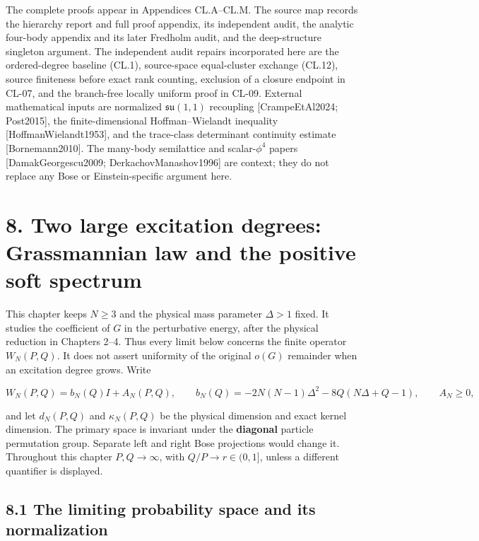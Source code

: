 \documentclass[a4paper,11pt]{article}
\numberwithin{equation}{section}
\begin{document}
The complete proofs appear in Appendices CL.A--CL.M. The source map records the hierarchy report and full proof appendix, its independent audit, the analytic four-body appendix and its later Fredholm audit, and the deep-structure singleton argument. The independent audit repairs incorporated here are the ordered-degree baseline (CL.1), source-space equal-cluster exchange (CL.12), source finiteness before exact rank counting, exclusion of a closure endpoint in CL-07, and the branch-free locally uniform proof in CL-09. External mathematical inputs are normalized \(\mathfrak{su}(1,1)\) recoupling {[}CrampeEtAl2024; Post2015{]}, the finite-dimensional Hoffman--Wielandt inequality {[}HoffmanWielandt1953{]}, and the trace-class determinant continuity estimate {[}Bornemann2010{]}. The many-body semilattice and scalar-\(\phi^4\) papers {[}DamakGeorgescu2009; DerkachovManashov1996{]} are context; they do not replace any Bose or Einstein-specific argument here.

\clearpage
\hypertarget{two-large-excitation-degrees-grassmannian-law-and-the-positive-soft-spectrum}{%
\section{8. Two large excitation degrees: Grassmannian law and the positive soft spectrum}\label{two-large-excitation-degrees-grassmannian-law-and-the-positive-soft-spectrum}}

This chapter keeps \(N\geq3\) and the physical mass parameter \(\Delta>1\) fixed. It studies the coefficient of \(G\) in the perturbative energy, after the physical reduction in Chapters 2--4. Thus every limit below concerns the finite operator \(W_N(P,Q)\). It does not assert uniformity of the original \(o(G)\) remainder when an excitation degree grows. Write

\[
W_N(P,Q)=b_N(Q)I+A_N(P,Q),\qquad
b_N(Q)=-2N(N-1)\Delta^2-8Q(N\Delta+Q-1),\qquad A_N\geq0,
\]

and let \(d_N(P,Q)\) and \(\kappa_N(P,Q)\) be the physical dimension and exact kernel dimension. The primary space is invariant under the \textbf{diagonal} particle permutation group. Separate left and right Bose projections would change it. Throughout this chapter \(P,Q\to\infty\), with \(Q/P\to r\in(0,1]\), unless a different quantifier is displayed.

\hypertarget{the-limiting-probability-space-and-its-normalization}{%
\subsection{8.1 The limiting probability space and its normalization}\label{the-limiting-probability-space-and-its-normalization}}
\end{document}
